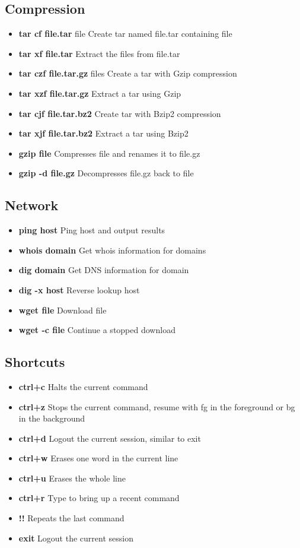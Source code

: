 \subsection{Compression}

\begin{itemize}
	\item \textbf{tar cf file.tar} file Create tar named file.tar containing file
	\item \textbf{tar xf file.tar} Extract the files from file.tar
	\item \textbf{tar czf file.tar.gz} files Create a tar with Gzip compression
	\item \textbf{tar xzf file.tar.gz} Extract a tar using Gzip
	\item \textbf{tar cjf file.tar.bz2} Create tar with Bzip2 compression
	\item \textbf{tar xjf file.tar.bz2} Extract a tar using Bzip2
	\item \textbf{gzip file} Compresses file and renames it to file.gz
	\item \textbf{gzip -d file.gz} Decompresses file.gz back to file
\end{itemize}

\subsection{Network}

\begin{itemize} 
	\item \textbf{ping host} Ping host and output results
	\item \textbf{whois domain} Get whois information for domains
	\item \textbf{dig domain} Get DNS information for domain
	\item \textbf{dig -x host} Reverse lookup host
	\item \textbf{wget file} Download file
	\item \textbf{wget -c file} Continue a stopped download
\end{itemize}

\subsection{Shortcuts}

\begin{itemize}
	\item \textbf{ctrl+c} Halts the current command
	\item \textbf{ctrl+z} Stops the current command, resume with fg in the foreground or bg in the background
	\item \textbf{ctrl+d} Logout the current session, similar to exit
	\item \textbf{ctrl+w} Erases one word in the current line
	\item \textbf{ctrl+u} Erases the whole line
	\item \textbf{ctrl+r} Type to bring up a recent command
	\item \textbf{!!} Repeats the last command
	\item \textbf{exit} Logout the current session
\end{itemize}

